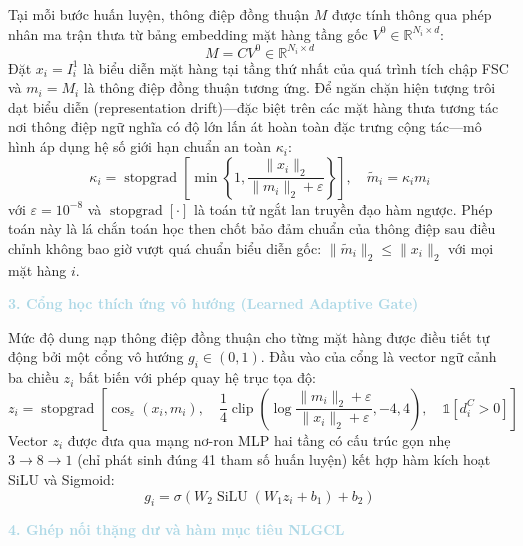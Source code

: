 Tại mỗi bước huấn luyện, thông điệp đồng thuận $M$ được tính thông qua phép nhân ma trận thưa từ bảng embedding mặt hàng tầng gốc $V^0 \in \mathbb{R}^{N_i \times d}$:
\begin{equation}
M = C V^0 \in \mathbb{R}^{N_i \times d}
\end{equation}
Đặt $x_i = I_i^1$ là biểu diễn mặt hàng tại tầng thứ nhất của quá trình tích chập FSC và $m_i = M_i$ là thông điệp đồng thuận tương ứng. Để ngăn chặn hiện tượng trôi dạt biểu diễn (representation drift)—đặc biệt trên các mặt hàng thưa tương tác nơi thông điệp ngữ nghĩa có độ lớn lấn át hoàn toàn đặc trưng cộng tác—mô hình áp dụng hệ số giới hạn chuẩn an toàn $\kappa_i$:
\begin{equation}
\kappa_i = \operatorname{stopgrad}\left[\min\left\{1, \frac{\|x_i\|_2}{\|m_i\|_2 + \varepsilon}\right\}\right], \quad \tilde{m}_i = \kappa_i m_i
\end{equation}
với $\varepsilon = 10^{-8}$ và $\operatorname{stopgrad}[\cdot]$ là toán tử ngắt lan truyền đạo hàm ngược. Phép toán này là lá chắn toán học then chốt bảo đảm chuẩn của thông điệp sau điều chỉnh không bao giờ vượt quá chuẩn biểu diễn gốc: $\|\tilde{m}_i\|_2 \le \|x_i\|_2$ với mọi mặt hàng $i$.

\noindent\textcolor{lightblue}{\textbf{3. Cổng học thích ứng vô hướng (Learned Adaptive Gate)}}

Mức độ dung nạp thông điệp đồng thuận cho từng mặt hàng được điều tiết tự động bởi một cổng vô hướng $g_i \in (0, 1)$. Đầu vào của cổng là vector ngữ cảnh ba chiều $z_i$ bất biến với phép quay hệ trục tọa độ:
\begin{equation}
z_i = \operatorname{stopgrad}\left[\cos_\varepsilon(x_i, m_i), \quad \frac{1}{4}\operatorname{clip}\left(\log\frac{\|m_i\|_2 + \varepsilon}{\|x_i\|_2 + \varepsilon}, -4, 4\right), \quad \mathbb{1}[d_i^C > 0]\right]
\end{equation}
Vector $z_i$ được đưa qua mạng nơ-ron MLP hai tầng có cấu trúc gọn nhẹ $3 \to 8 \to 1$ (chỉ phát sinh đúng 41 tham số huấn luyện) kết hợp hàm kích hoạt SiLU và Sigmoid:
\begin{equation}
g_i = \sigma\left(W_2 \operatorname{SiLU}(W_1 z_i + b_1) + b_2\right)
\end{equation}

\noindent\textcolor{lightblue}{\textbf{4. Ghép nối thặng dư và hàm mục tiêu NLGCL}}


